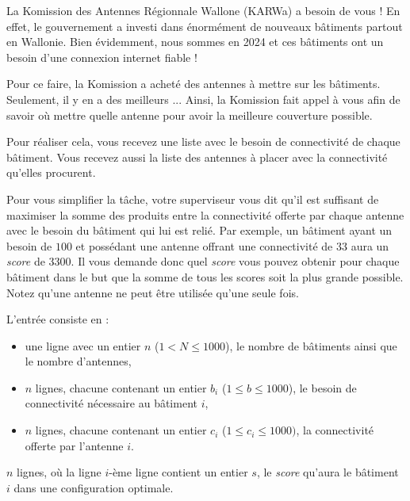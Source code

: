 \problemname{\problemyamlname}


La Komission des Antennes Régionnale Wallone (KARWa) a besoin de vous ! En effet, le gouvernement a investi dans énormément de nouveaux bâtiments partout en Wallonie. Bien évidemment, nous sommes en 2024 et ces bâtiments ont un besoin d'une connexion internet fiable !

Pour ce faire, la Komission a acheté des antennes à mettre sur les bâtiments. Seulement, il y en a des meilleurs ... Ainsi, la Komission fait appel à vous afin de savoir où mettre quelle antenne pour avoir la meilleure couverture possible.

Pour réaliser cela, vous recevez une liste avec le besoin de connectivité de chaque bâtiment. Vous recevez aussi la liste des antennes à placer avec la connectivité qu'elles procurent.

Pour vous simplifier la tâche, votre superviseur vous dit qu'il est suffisant de maximiser la somme des produits entre la connectivité offerte par chaque antenne avec le besoin du bâtiment qui lui est relié. Par exemple, un bâtiment ayant un besoin de $100$ et possédant une antenne offrant une connectivité de $33$ aura un \emph{score} de $3300$. Il vous demande donc quel \emph{score} vous pouvez obtenir pour chaque bâtiment dans le but que la somme de tous les scores soit la plus grande possible. Notez qu'une antenne ne peut être utilisée qu'une seule fois.

\begin{Input}
    L'entrée consiste en :
    \begin{itemize}
      \item une ligne avec un entier $n$ ($1 < N \leq 1000$), le nombre de bâtiments ainsi que le nombre d'antennes,
      \item $n$ lignes, chacune contenant un entier $b_i$ ($1 \leq b \leq 1000$), le besoin de connectivité nécessaire au bâtiment $i$,
      \item $n$ lignes, chacune contenant un entier $c_i$ ($1 \leq c_i \leq 1000)$, la connectivité offerte par l'antenne $i$.
    \end{itemize}
\end{Input}

\begin{Output}
  $n$ lignes, où la ligne $i$-ème ligne contient un entier $s$, le \emph{score} qu'aura le bâtiment $i$ dans une configuration optimale.
\end{Output}
